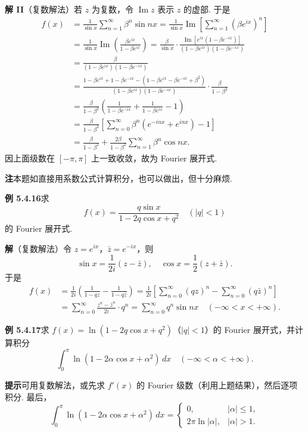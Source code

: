 \documentclass[UTF8,12pt,a4paper,fontset=fandol]{ctexart}
\begin{document}
\noindent\textbf{解 II}\quad （复数解法）若 $z$ 为复数，令 $\operatorname{Im}z$ 表示 $z$ 的虚部. 于是
\[
\begin{aligned}
f(x)&=\frac1{\sin x}\sum_{n=1}^{\infty}\beta^n\sin nx
=\frac1{\sin x}\operatorname{Im}\left[\sum_{n=1}^{\infty}(\beta e^{ix})^n\right]\\
&=\frac1{\sin x}\operatorname{Im}\left(\frac{\beta e^{ix}}{1-\beta e^{ix}}\right)
=\frac{\beta}{\sin x}\cdot
\frac{\operatorname{Im}[e^{ix}(1-\beta e^{-ix})]}
{(1-\beta e^{ix})(1-\beta e^{-ix})}\\
&=\frac{\beta}{(1-\beta e^{ix})(1-\beta e^{-ix})}\\
&=\frac{1-\beta e^{ix}+1-\beta e^{-ix}-(1-\beta e^{ix}-\beta e^{-ix}+\beta^2)}
{(1-\beta e^{ix})(1-\beta e^{-ix})}\cdot\frac{\beta}{1-\beta^2}\\
&=\frac{\beta}{1-\beta^2}\left(\frac1{1-\beta e^{-ix}}+\frac1{1-\beta e^{ix}}-1\right)\\
&=\frac{\beta}{1-\beta^2}\left[\sum_{n=0}^{\infty}\beta^n(e^{-inx}+e^{inx})-1\right]\\
&=\frac{\beta}{1-\beta^2}+\frac{2\beta}{1-\beta^2}\sum_{n=1}^{\infty}\beta^n\cos nx.
\end{aligned}
\]
因上面级数在 $[-\pi,\pi]$ 上一致收敛，故为 Fourier 展开式.

\noindent\textbf{注}\quad 本题如直接用系数公式计算积分，也可以做出，但十分麻烦.

\noindent\textbf{例 5.4.16}\quad 求
\[
  f(x)=\frac{q\sin x}{1-2q\cos x+q^2}\quad(|q|<1)
\]
的 Fourier 展开式.

\noindent\textbf{解}\quad （复数解法）令 $z=e^{ix}$，$\bar z=e^{-ix}$，则
\[
  \sin x=\frac1{2i}(z-\bar z),\quad \cos x=\frac12(z+\bar z).
\]
于是
\[
\begin{aligned}
f(x)&=\frac1{2i}\left(\frac1{1-qz}-\frac1{1-q\bar z}\right)
=\frac1{2i}\left[\sum_{n=0}^{\infty}(qz)^n-\sum_{n=0}^{\infty}(q\bar z)^n\right]\\
&=\sum_{n=0}^{\infty}\frac{z^n-\bar z^n}{2i}\cdot q^n
=\sum_{n=0}^{\infty}q^n\sin nx\quad(-\infty<x<+\infty).
\end{aligned}
\]

\noindent\textbf{例 5.4.17}\quad 求 $f(x)=\ln(1-2q\cos x+q^2)$（$|q|<1$）的 Fourier 展开式，并计算积分
\[
  \int_0^{\pi}\ln(1-2\alpha\cos x+\alpha^2)\,dx\quad(-\infty<\alpha<+\infty).
\]

\noindent\textbf{提示}\quad 可用复数解法，或先求 $f'(x)$ 的 Fourier 级数（利用上题结果），然后逐项积分. 最后，
\[
  \int_0^{\pi}\ln(1-2\alpha\cos x+\alpha^2)\,dx
  =
  \begin{cases}
  0,&|\alpha|\le1,\\
  2\pi\ln|\alpha|,&|\alpha|>1.
  \end{cases}
\]
\end{document}
